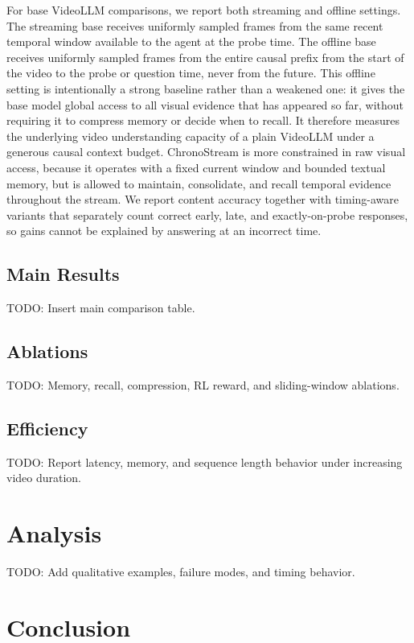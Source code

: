 \documentclass[11pt]{article}
\begin{document}
For base VideoLLM comparisons, we report both streaming and offline settings.
The streaming base receives uniformly sampled frames from the same recent temporal window available to the agent at the probe time.
The offline base receives uniformly sampled frames from the entire causal prefix from the start of the video to the probe or question time, never from the future.
This offline setting is intentionally a strong baseline rather than a weakened one: it gives the base model global access to all visual evidence that has appeared so far, without requiring it to compress memory or decide when to recall.
It therefore measures the underlying video understanding capacity of a plain VideoLLM under a generous causal context budget.
ChronoStream is more constrained in raw visual access, because it operates with a fixed current window and bounded textual memory, but is allowed to maintain, consolidate, and recall temporal evidence throughout the stream.
We report content accuracy together with timing-aware variants that separately count correct early, late, and exactly-on-probe responses, so gains cannot be explained by answering at an incorrect time.

\subsection{Main Results}

TODO: Insert main comparison table.

\subsection{Ablations}

TODO: Memory, recall, compression, RL reward, and sliding-window ablations.

\subsection{Efficiency}

TODO: Report latency, memory, and sequence length behavior under increasing video duration.

\section{Analysis}

TODO: Add qualitative examples, failure modes, and timing behavior.

\section{Conclusion}
\end{document}
